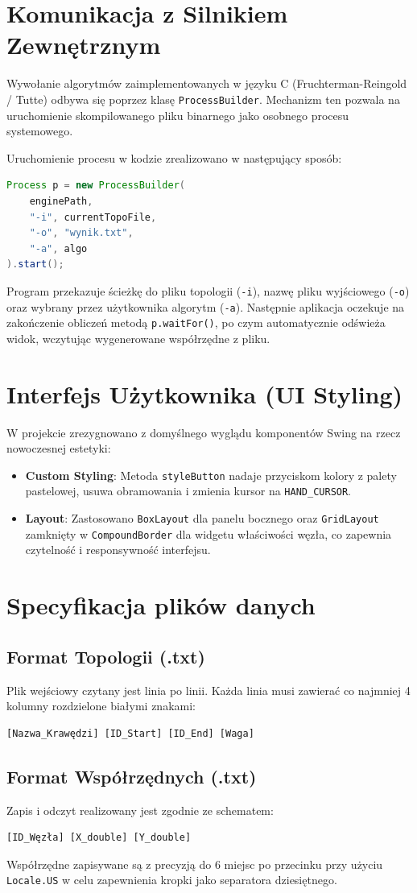 \documentclass[12pt, a4paper]{article}
\begin{document}
\section{Komunikacja z Silnikiem Zewnętrznym}
Wywołanie algorytmów zaimplementowanych w języku C (Fruchterman-Reingold / Tutte) odbywa się poprzez klasę \texttt{ProcessBuilder}. Mechanizm ten pozwala na uruchomienie skompilowanego pliku binarnego jako osobnego procesu systemowego.

Uruchomienie procesu w kodzie zrealizowano w następujący sposób:

\begin{lstlisting}[language=Java]
Process p = new ProcessBuilder(
    enginePath, 
    "-i", currentTopoFile, 
    "-o", "wynik.txt", 
    "-a", algo
).start();
\end{lstlisting}

Program przekazuje ścieżkę do pliku topologii (\texttt{-i}), nazwę pliku wyjściowego (\texttt{-o}) oraz wybrany przez użytkownika algorytm (\texttt{-a}). Następnie aplikacja oczekuje na zakończenie obliczeń metodą \texttt{p.waitFor()}, po czym automatycznie odświeża widok, wczytując wygenerowane współrzędne z pliku.
\section{Interfejs Użytkownika (UI Styling)}
W projekcie zrezygnowano z domyślnego wyglądu komponentów Swing na rzecz nowoczesnej estetyki:
\begin{itemize}
    \item \textbf{Custom Styling}: Metoda \texttt{styleButton} nadaje przyciskom kolory z palety pastelowej, usuwa obramowania i zmienia kursor na \texttt{HAND\_CURSOR}.
    \item \textbf{Layout}: Zastosowano \texttt{BoxLayout} dla panelu bocznego oraz \texttt{GridLayout} zamknięty w \texttt{CompoundBorder} dla widgetu właściwości węzła, co zapewnia czytelność i responsywność interfejsu.
\end{itemize}

\section{Specyfikacja plików danych}
\subsection{Format Topologii (.txt)}
Plik wejściowy czytany jest linia po linii. Każda linia musi zawierać co najmniej 4 kolumny rozdzielone białymi znakami:
\begin{verbatim}
[Nazwa_Krawędzi] [ID_Start] [ID_End] [Waga]
\end{verbatim}

\subsection{Format Współrzędnych (.txt)}
Zapis i odczyt realizowany jest zgodnie ze schematem:
\begin{verbatim}
[ID_Węzła] [X_double] [Y_double]
\end{verbatim}
Współrzędne zapisywane są z precyzją do 6 miejsc po przecinku przy użyciu \texttt{Locale.US} w celu zapewnienia kropki jako separatora dziesiętnego.
\end{document}

